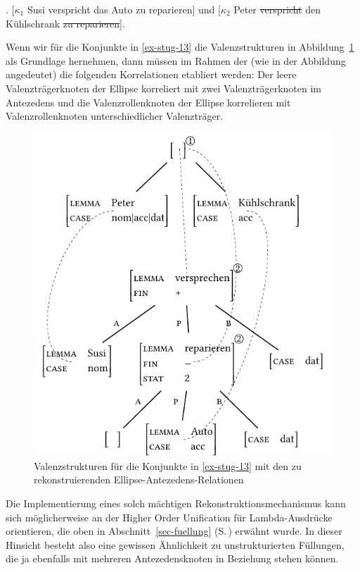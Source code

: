 \ex. \label{ex-stug-13} [$\kappa_1$ Susi verspricht das Auto zu reparieren] und [$\kappa_2$ Peter \sout{verspricht} den Kühlschrank \sout{zu reparieren}].

Wenn wir für die Konjunkte in \ref{ex-stug-13} die Valenzstrukturen in Abbildung~\ref{fig-stug-17} als Grundlage hernehmen, dann müssen im Rahmen der  (wie in der Abbildung angedeutet) die folgenden Korrelationen etabliert werden: Der leere Valenzträgerknoten der Ellipse korreliert mit zwei Valenzträgerknoten im Antezedens und die Valenzrollenknoten der Ellipse korrelieren mit Valenzrollenknoten unterschiedlicher Valenzträger.
\begin{figure}[t]
\centering
\includegraphics{graphics/abb917.pdf}
\caption{\label{fig-stug-17}Valenzstrukturen für die Konjunkte in \ref{ex-stug-13} mit den zu rekonstruierenden Ellipse-Antezedens-Relationen}
\end{figure}
Die Implementierung eines solch mächtigen Rekonstruktionsmechanismus kann sich möglicherweise an der Higher Order Unification für Lambda-Ausdrücke orientieren, die oben in Abschnitt~\ref{sec-fuellung} (S.\,\pageref{ex-fuellung-4}) erwähnt wurde. In dieser Hinsicht besteht also eine gewissen Ähnlichkeit zu unstrukturierten Füllungen, die ja ebenfalls mit mehreren Antezedensknoten in Beziehung stehen können. 

